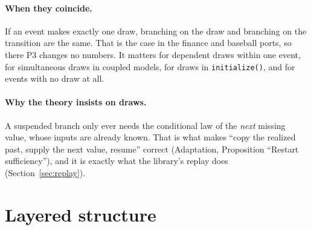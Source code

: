 \documentclass[11pt]{article}
\newcommand{\code}[1]{\texttt{#1}}
\begin{document}
\paragraph{When they coincide.} If an event makes exactly one draw, branching on the draw and branching on the
transition are the same. That is the case in the finance and baseball ports, so there P3 changes no numbers. It
matters for dependent draws within one event, for simultaneous draws in coupled models, for draws in
\code{initialize()}, and for events with no draw at all.

\paragraph{Why the theory insists on draws.} A suspended branch only ever needs the conditional law of the
\emph{next} missing value, whose inputs are already known. That is what makes ``copy the realized past, supply the
next value, resume'' correct (Adaptation, Proposition ``Restart sufficiency''), and it is exactly what the library's
replay does (Section~\ref{sec:replay}).

\section{Layered structure}
\end{document}
